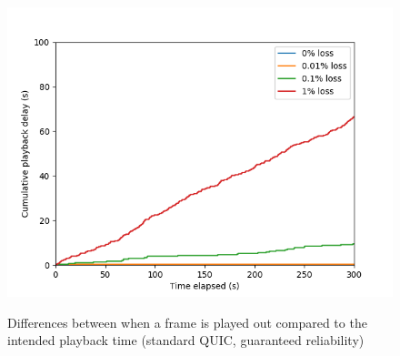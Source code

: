 \documentclass{mpaper}
\begin{document}
\begin{figure}
{   \includegraphics[scale=0.5]{images/graphics-reliable/150ms-offsets-combined-reliable.png}
   \label{playback-rel-150}
 }
 \caption{Differences between when a frame is played out compared to the intended playback time (standard QUIC, guaranteed reliability)}
 \label{playback-rel}
\end{figure}
\end{document}
